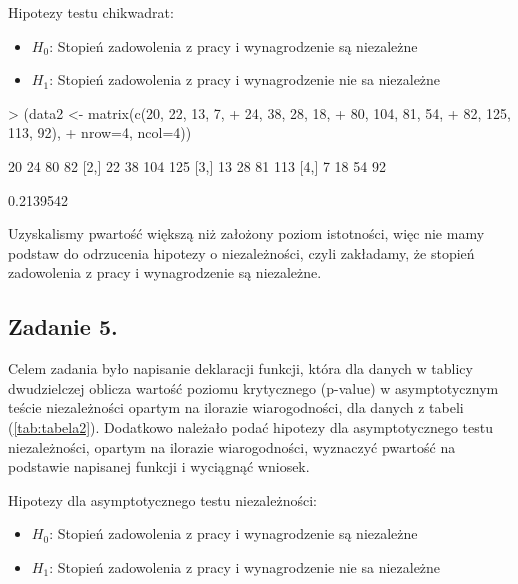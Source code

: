 \documentclass[12pt]{mwart}
\begin{document}
Hipotezy testu chi{\dywiz}kwadrat:
\begin{itemize}[label=$\bullet$]
	\item $H_0$: Stopień zadowolenia z pracy i wynagrodzenie są niezależne
	\item $H_1$: Stopień zadowolenia z pracy i wynagrodzenie nie sa niezależne
\end{itemize}

\begin{Schunk}
\begin{Sinput}
> (data2 <- matrix(c(20, 22, 13, 7,
+       		24, 38, 28, 18,
+       		80, 104, 81, 54,
+       		82, 125, 113, 92),
+       		nrow=4, ncol=4))
\end{Sinput}
\begin{Soutput}
     [,1] [,2] [,3] [,4]
[1,]   20   24   80   82
[2,]   22   38  104  125
[3,]   13   28   81  113
[4,]    7   18   54   92
\end{Soutput}
\end{Schunk}

\begin{Schunk}
\begin{Soutput}
[1] 0.2139542
\end{Soutput}
\end{Schunk}

Uzyskalismy p{\dywiz}wartość większą niż założony poziom istotności, więc nie mamy podstaw do odrzucenia hipotezy o niezależności, czyli zakładamy, że stopień zadowolenia z pracy i wynagrodzenie są niezależne.

\subsection{Zadanie 5.}
Celem zadania było napisanie deklaracji funkcji, która dla danych w tablicy dwudzielczej oblicza wartość poziomu krytycznego (p-value) w asymptotycznym teście niezależności opartym na ilorazie wiarogodności, dla danych z tabeli (\ref{tab:tabela2}). Dodatkowo należało podać hipotezy dla asymptotycznego testu niezależności, opartym na ilorazie wiarogodności, wyznaczyć p{\dywiz}wartość na podstawie napisanej funkcji i wyciągnąć wniosek.

Hipotezy dla asymptotycznego testu niezależności:
\begin{itemize}[label=$\bullet$]
	\item $H_0$: Stopień zadowolenia z pracy i wynagrodzenie są niezależne
	\item $H_1$: Stopień zadowolenia z pracy i wynagrodzenie nie sa niezależne
\end{itemize}
\end{document}
